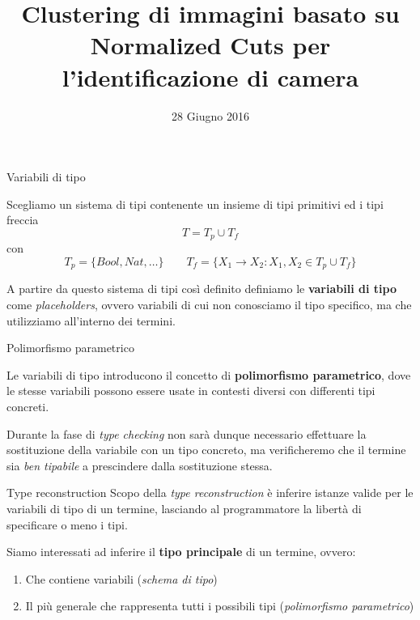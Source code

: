 \documentclass{beamer}
\author{}
\title{\huge Clustering di immagini basato su Normalized Cuts per l’identificazione di camera}
\date{28 Giugno 2016}
\begin{document}
\titlepageframe


\begin{tframe}{Variabili di tipo}

Scegliamo un sistema di tipi contenente un insieme di tipi primitivi ed i tipi freccia
$$T = T_p \cup T_f$$
con
$$T_p = \{Bool, Nat, \ldots \} \qquad T_f = \{X_1 \rightarrow X_2 : X_1, X_2 \in T_p \cup T_f \}$$
\vspace{0.1cm}

A partire da questo sistema di tipi così definito definiamo le \textbf{variabili di tipo} come \emph{placeholders}, ovvero variabili di cui non conosciamo il tipo specifico, ma che utilizziamo all'interno dei termini.
\end{tframe}


\begin{tframe}{Polimorfismo parametrico}

Le variabili di tipo introducono il concetto di \textbf{polimorfismo parametrico}, dove le stesse variabili possono essere usate in contesti diversi con differenti tipi concreti.

\vspace{0.4cm}

Durante la fase di \emph{type checking} non sarà dunque necessario effettuare la sostituzione della variabile con un tipo concreto, ma verificheremo che il termine sia \emph{ben tipabile} a prescindere dalla sostituzione stessa.
\end{tframe}



\begin{tframe}{Type reconstruction}
Scopo della \emph{type reconstruction} è inferire istanze valide per le variabili di tipo di un termine, lasciando al programmatore la libertà di specificare o meno i tipi.

\vspace{0.4cm}

Siamo interessati ad inferire il \textbf{tipo principale} di un termine, ovvero:

\vspace{0.1cm}

\begin{enumerate}
\item Che contiene variabili (\emph{schema di tipo})
\item Il più generale che rappresenta tutti i possibili tipi (\emph{polimorfismo parametrico})
\end{enumerate}
\end{tframe}
\end{document}
